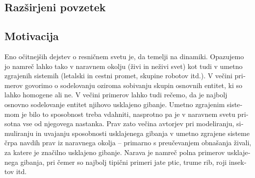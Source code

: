 \graphicspath{{img/}}









\begin{slovenian}

\chapter{Razširjeni povzetek}
\label{chap:a}


\section{Motivacija}
Eno očitnejših dejstev o resničnem svetu je, da temelji na dinamiki. Opazujemo jo namreč lahko tako v naravnem okolju (živi in neživi svet) kot tudi v umetno zgrajenih sistemih (letalski in cestni promet, skupine robotov itd.). V večini primerov govorimo o sodelovanju oziroma sobivanju skupin osnovnih entitet, ki so lahko homogene ali ne. V večini primerov lahko tudi rečemo, da je najbolj osnovno sodelovanje entitet njihovo usklajeno gibanje. Umetno zgrajenim sistemom je bilo to sposobnost treba vdahniti, nasprotno pa je v naravnem svetu prisotna vse od njegovega nastanka. Prav zato večina avtorjev \cite{bonabeau:1999, braitenberg:1984,jadbabaie:2003,mataric:1995} pri modeliranju, simuliranju in uvajanju sposobnosti usklajenega gibanja v umetno zgrajene sisteme črpa navdih prav iz naravnega okolja -- primarno s preučevanjem obnašanja živali, za katere je značilno usklajeno gibanje. Narava je namreč polna primerov usklajenega gibanja, pri čemer so najbolj tipični primeri jate ptic, trume rib, roji insektov itd.


\end{slovenian}
